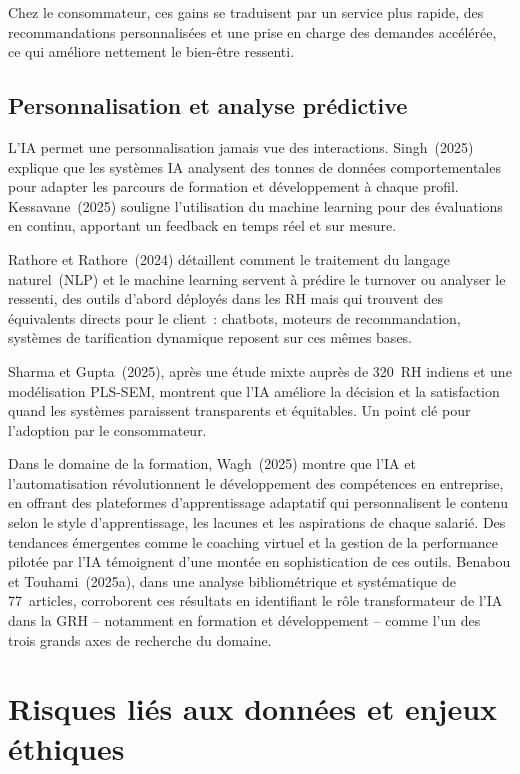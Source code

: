 \documentclass[12pt,a4paper]{article}
\begin{document}
Chez le consommateur, ces gains se traduisent par un service plus rapide, des recommandations
personnalisées et une prise en charge des demandes accélérée, ce qui améliore
nettement le bien-être ressenti.

\subsection{Personnalisation et analyse prédictive}

L'IA permet une personnalisation jamais vue des interactions. Singh~(2025) explique que les
systèmes IA analysent des tonnes de données comportementales pour adapter les parcours
de formation et développement à chaque profil. Kessavane~(2025) souligne l'utilisation du
machine learning pour des évaluations en continu, apportant un feedback en temps réel et
sur mesure.

Rathore et Rathore~(2024) détaillent comment le traitement du langage naturel~(NLP) et
le machine learning servent à prédire le turnover ou analyser le ressenti, des outils d'abord
déployés dans les RH mais qui trouvent des équivalents directs pour le client~: chatbots,
moteurs de recommandation, systèmes de tarification dynamique reposent sur ces mêmes
bases.

Sharma et Gupta~(2025), après une étude mixte auprès de 320~RH indiens et une modélisation
PLS-SEM, montrent que l'IA améliore la décision et la satisfaction quand les systèmes
paraissent transparents et équitables. Un point clé pour l'adoption par le consommateur.

Dans le domaine de la formation, Wagh~(2025) montre que l'IA et l'automatisation
révolutionnent le développement des compétences en entreprise, en offrant des plateformes
d'apprentissage adaptatif qui personnalisent le contenu selon le style d'apprentissage,
les lacunes et les aspirations de chaque salarié. Des tendances émergentes comme le coaching
virtuel et la gestion de la performance pilotée par l'IA témoignent d'une montée en
sophistication de ces outils. Benabou et Touhami~(2025a), dans une analyse bibliométrique
et systématique de 77~articles, corroborent ces résultats en identifiant le rôle transformateur
de l'IA dans la GRH -- notamment en formation et développement -- comme l'un des trois
grands axes de recherche du domaine.

\section{Risques liés aux données et enjeux éthiques}
\end{document}
